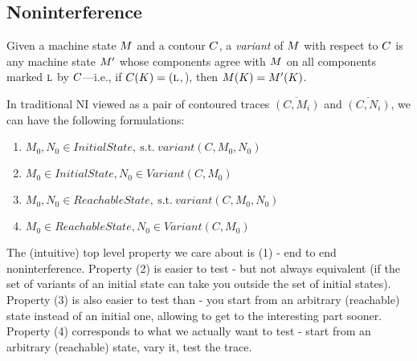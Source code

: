 \documentclass[conference]{IEEEtran}
\begin{document}




\subsection{Noninterference}

Given a machine state $M$ and a contour $C$, a {\em variant} of
$M$ with respect to $C$ is any machine state $M'$ whose
components agree with $M$ on all components marked $\textsc{l}$ by
$C$---i.e., if $C(K) = (\textsc{l}$,\,\underscore), then
$M(K) = M'(K)$.



In traditional NI viewed as a pair of contoured traces $\overline{(C, M_i)}$ and
$\overline{(C, N_i)}$, we can have the following formulations:
\begin{enumerate}
\item $M_0, N_0 \in \mathit{Initial State}, ~\text{s.t.} ~\mathit{variant}(C, M_0, N_0)$
\item $M_0 \in \mathit{Initial State}, N_0 \in \mathit{Variant}(C, M_0)$
\item $M_0, N_0 \in \mathit{Reachable State}, ~\text{s.t.} ~\mathit{variant}(C, M_0, N_0)$
\item $M_0 \in \mathit{Reachable State}, N_0 \in \mathit{Variant}(C, M_0)$
\end{enumerate}
%
The (intuitive) top level property we care about is (1) - end to end
noninterference.
%
Property (2) is easier to test - but not always equivalent (if the set
of variants of an initial state can take you outside the set of
initial states).
%
Property (3) is also easier to test than - you start from an arbitrary
(reachable) state instead of an initial one, allowing to get to the
interesting part sooner.
%
Property (4) corresponds to what we actually want to test - start from
an arbitrary (reachable) state, vary it, test the trace.
\end{document}
